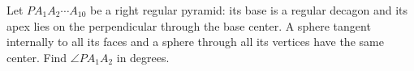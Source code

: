 Let $PA_1A_2\cdots A_{10}$ be a right regular pyramid: its base is a regular decagon and its apex lies on the perpendicular through the base center. A sphere tangent internally to all its faces and a sphere through all its vertices have the same center. Find $\angle PA_1A_2$ in degrees.
